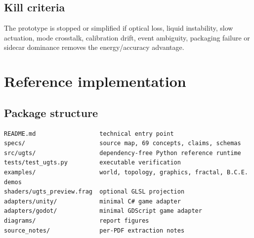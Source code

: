 \documentclass[10.5pt,a4paper,openany]{book}
\begin{document}
\section{Kill criteria}
The prototype is stopped or simplified if optical loss, liquid instability, slow actuation, mode crosstalk, calibration drift, event ambiguity, packaging failure or sidecar dominance removes the energy/accuracy advantage.

\chapter{Reference implementation}
\section{Package structure}
\begin{lstlisting}[language={},caption={Delivered package layout}]
README.md                  technical entry point
specs/                     source map, 69 concepts, claims, schemas
src/ugts/                  dependency-free Python reference runtime
tests/test_ugts.py         executable verification
examples/                  world, topology, graphics, fractal, B.C.E. demos
shaders/ugts_preview.frag  optional GLSL projection
adapters/unity/            minimal C# game adapter
adapters/godot/            minimal GDScript game adapter
diagrams/                  report figures
source_notes/              per-PDF extraction notes
\end{lstlisting}
\end{document}
